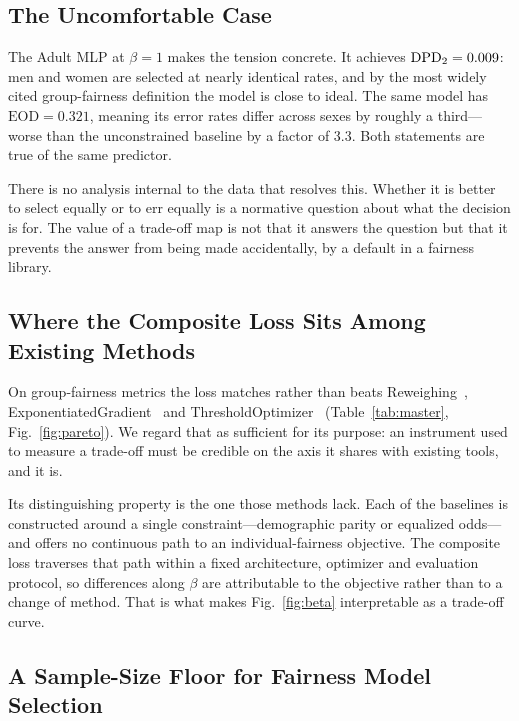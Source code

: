 \subsection{The Uncomfortable Case}

The Adult MLP at $\beta=1$ makes the tension concrete. It achieves
$\mathrm{DPD}_{2} = 0.009$: men and women are selected at nearly identical rates, and
by the most widely cited group-fairness definition the model is close to
ideal. The same model has $\mathrm{EOD} = 0.321$, meaning its error rates
differ across sexes by roughly a third---worse than the unconstrained baseline
by a factor of $3.3$. Both statements are true of the same predictor.

There is no analysis internal to the data that resolves this. Whether it is
better to select equally or to err equally is a normative question about what
the decision is for. The value of a trade-off map is not that it answers the
question but that it prevents the answer from being made accidentally, by a
default in a fairness library.

\subsection{Where the Composite Loss Sits Among Existing Methods}

On group-fairness metrics the loss matches rather than beats
Reweighing~\cite{kamiran2012data},
ExponentiatedGradient~\cite{agarwal2018reductions} and
ThresholdOptimizer~\cite{hardt2016equality}
(Table~\ref{tab:master}, Fig.~\ref{fig:pareto}). We regard that as sufficient
for its purpose: an instrument used to measure a trade-off must be credible on
the axis it shares with existing tools, and it is.

Its distinguishing property is the one those methods lack. Each of the
baselines is constructed around a single constraint---demographic parity or
equalized odds---and offers no continuous path to an individual-fairness
objective. The composite loss traverses that path within a fixed architecture,
optimizer and evaluation protocol, so differences along $\beta$ are
attributable to the objective rather than to a change of method. That is what
makes Fig.~\ref{fig:beta} interpretable as a trade-off curve.

\subsection{A Sample-Size Floor for Fairness Model Selection}

